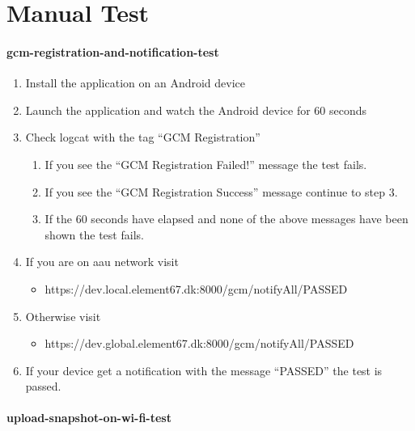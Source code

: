 
\chapter{Manual Test}
\label{app:manual_test}


\subsubsection{gcm-registration-and-notification-test}

\begin{enumerate}
    \item Install the application on an Android device
    \item Launch the application and watch the Android device for 60 seconds
    \item Check logcat with the tag ``GCM Registration''
        \begin{enumerate}
            \item If you see the ``GCM Registration Failed!'' message the test fails.
            \item If you see the ``GCM Registration Success'' message continue to step 3.
            \item If the 60 seconds have elapsed and none of the above messages have been shown the test fails.
        \end{enumerate}
    \item If you are on aau network visit
        \begin{itemize}
            \item https://dev.local.element67.dk:8000/gcm/notifyAll/PASSED
        \end{itemize}
    \item Otherwise visit
        \begin{itemize}
            \item https://dev.global.element67.dk:8000/gcm/notifyAll/PASSED
        \end{itemize}
    \item If your device get a notification with the message ``PASSED'' the test is passed.
\end{enumerate}

\subsubsection{upload-snapshot-on-wi-fi-test}

